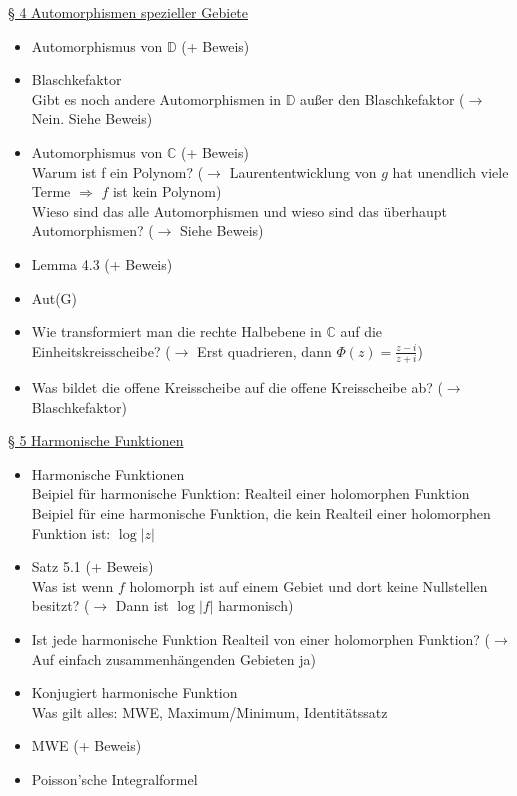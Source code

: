 \documentclass[11pt]{article}
\newcommand{\C}{\mathbb{C}}
\newcommand{\D}{\mathbb{D}}
\begin{document}
\underline{§ 4 Automorphismen spezieller Gebiete} 
\vspace{-0.5cm}
\begin{itemize}
\item Automorphismus von $\D$ (+ Beweis)
\item Blaschkefaktor \\
\quad Gibt es noch andere Automorphismen in $\D$ außer den Blaschkefaktor ($\rightarrow$ Nein. Siehe Beweis)
\item Automorphismus von $\C$ (+ Beweis) \\
\quad Warum ist f ein Polynom? ($\rightarrow$ Laurententwicklung von $g$ hat unendlich viele Terme $\Rightarrow$ $f$ ist kein Polynom) \\
\quad Wieso sind das alle Automorphismen und wieso sind das überhaupt Automorphismen? ($\rightarrow$ Siehe Beweis)
\item Lemma 4.3 (+ Beweis)
\item Aut(G)
\item Wie transformiert man die rechte Halbebene in $\C$ auf die Einheitskreisscheibe? ($\rightarrow$ Erst quadrieren, dann $\Phi(z) = \frac{z-i}{z+i}$)
\item Was bildet die offene Kreisscheibe auf die offene Kreisscheibe ab? ($\rightarrow$ Blaschkefaktor)
\end{itemize}

\underline{§ 5 Harmonische Funktionen}
\vspace{-0.5cm}
\begin{itemize}
\item Harmonische Funktionen \\
\quad Beipiel für harmonische Funktion: Realteil einer holomorphen Funktion \\
\quad Beipiel für eine harmonische Funktion, die kein Realteil einer holomorphen Funktion ist: $\log|z|$
\item Satz 5.1 (+ Beweis) \\
\quad Was ist wenn $f$ holomorph ist auf einem Gebiet und dort keine Nullstellen besitzt? ($\rightarrow$ Dann ist $\log|f|$ harmonisch)
\item Ist jede harmonische Funktion Realteil von einer holomorphen Funktion? ($\rightarrow$ Auf einfach zusammenhängenden Gebieten ja)
\item Konjugiert harmonische Funktion \\
\quad Was gilt alles: MWE, Maximum/Minimum, Identitätssatz
\item MWE (+ Beweis)
\item Poisson'sche Integralformel
\end{itemize}
\end{document}
